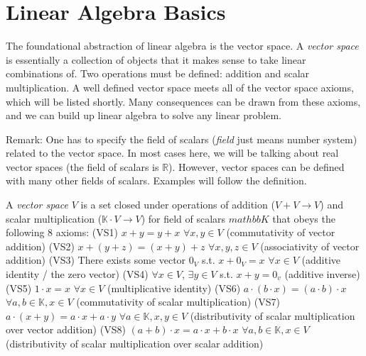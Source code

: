 \chapter{Linear Algebra Basics}
    The foundational abstraction of linear algebra is the vector space. A \textit{vector space} is essentially a collection of objects that it
makes sense to take linear combinations of. Two operations must be defined: addition and scalar multiplication. A well defined
vector space meets all of the vector space axioms, which will be listed shortly. Many consequences can be drawn from these axioms,
and we can build up linear algebra to solve any linear problem.

Remark: One has to specify the field of scalars (\textit{field} just means number system) related to the vector space. In most cases
here, we will be talking about real vector spaces (the field of scalars is $\mathbb{R}$). However, vector spaces can be defined with
many other fields of scalars. Examples will follow the definition.

 {
    A \textit{vector space} $V$ is a set closed under operations of addition ($V + V \rightarrow V$) and scalar multiplication 
    ($\mathbb{K} \cdot V \rightarrow V$) for field of scalars $mathbb{K}$ that obeys the following 8 axioms: \newline
    (VS1) $x + y = y + x$  $\forall x, y \in V$ (commutativity of vector addition) \newline
    (VS2) $x + (y + z) = (x + y) + z$  $\forall x, y, z \in V$ (associativity of vector addition) \newline
    (VS3) There exists some vector $0_V$ s.t. $x + 0_V = x$  $\forall x \in V$ (additive identity / the zero vector) \newline
    (VS4) $\forall x \in V$,  $\exists y \in V$ s.t. $x + y = 0_v$ (additive inverse) \newline
    (VS5) $1 \cdot x = x$  $\forall x \in V$ (multiplicative identity) \newline
    (VS6) $a \cdot (b \cdot x) = (a \cdot b) \cdot x$  $\forall a, b \in \mathbb{K}, x \in V$ (commutativity of scalar multiplication) \newline
    (VS7) $a \cdot (x + y) = a \cdot x + a \cdot y$  $\forall a \in \mathbb{K}, x, y \in V$ \newline
    (distributivity of scalar multiplication over vector addition) \newline
    (VS8) $(a + b) \cdot x = a \cdot x + b \cdot x$  $\forall a, b \in \mathbb{K}, x \in V$ \newline 
    (distributivity of scalar multiplication over scalar addition) \newline
}

